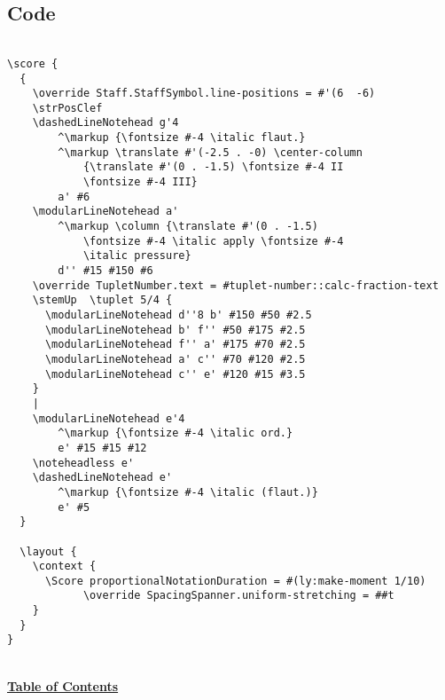 \subsection{Code}
\begin{verbatim}

\score {
  {
    \override Staff.StaffSymbol.line-positions = #'(6  -6)
    \strPosClef 
    \dashedLineNotehead g'4
    	^\markup {\fontsize #-4 \italic flaut.}
    	^\markup \translate #'(-2.5 . -0) \center-column 
			{\translate #'(0 . -1.5) \fontsize #-4 II 
			\fontsize #-4 III} 
		a' #6
    \modularLineNotehead a'
    	^\markup \column {\translate #'(0 . -1.5) 
			\fontsize #-4 \italic apply \fontsize #-4 
			\italic pressure} 
		d'' #15 #150 #6
    \override TupletNumber.text = #tuplet-number::calc-fraction-text
    \stemUp  \tuplet 5/4 {
      \modularLineNotehead d''8 b' #150 #50 #2.5
      \modularLineNotehead b' f'' #50 #175 #2.5
      \modularLineNotehead f'' a' #175 #70 #2.5
      \modularLineNotehead a' c'' #70 #120 #2.5
      \modularLineNotehead c'' e' #120 #15 #3.5
    }
    |
    \modularLineNotehead e'4
    	^\markup {\fontsize #-4 \italic ord.} 
		e' #15 #15 #12
    \noteheadless e'
    \dashedLineNotehead e'
    	^\markup {\fontsize #-4 \italic (flaut.)} 
		e' #5
  }

  \layout {
    \context {
      \Score proportionalNotationDuration = #(ly:make-moment 1/10)    
      		\override SpacingSpanner.uniform-stretching = ##t
    }
  }
}

\end{verbatim}

\hyperref[sec:toc]{\\ \textbf{Table of Contents}}

\vfill \break


